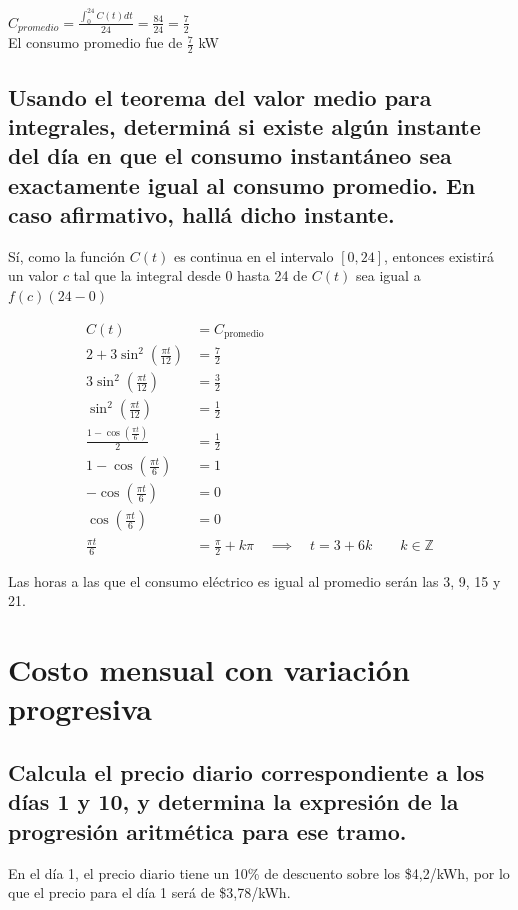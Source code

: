 \documentclass[11pt, a4paper]{article}
\begin{document}
$C_{promedio} = \frac{\int_{0}^{24} C(t)dt}{24} = \frac{84}{24} = \frac{7}{2}$\\

El consumo promedio fue de $\frac{7}{2}$ kW

\subsection{Usando el teorema del valor medio para integrales, determiná si existe algún instante del día en que el consumo instantáneo sea exactamente igual al consumo promedio. En caso afirmativo, hallá dicho instante.}

Sí, como la función $C(t)$ es continua en el intervalo $[0,24]$, entonces existirá un valor $c$ tal que la integral desde 0 hasta 24 de $C(t)$ sea igual a $f(c)(24 - 0)$

\begin{align*}
    C(t) &= C_{\text{promedio}} \\
    2 + 3\sin^2\left(\frac{\pi t}{12}\right) &= \frac{7}{2} \\
    3\sin^2\left(\frac{\pi t}{12}\right) &= \frac{3}{2} \\
    \sin^2\left(\frac{\pi t}{12}\right) &= \frac{1}{2} \\
    \frac{1 - \cos\left(\frac{\pi t}{6}\right)}{2} &= \frac{1}{2} \\
    1 - \cos\left(\frac{\pi t}{6}\right) &= 1 \\
    -\cos\left(\frac{\pi t}{6}\right) &= 0 \\
    \cos\left(\frac{\pi t}{6}\right) &= 0 \\
    \frac{\pi t}{6} &= \frac{\pi}{2} + k \pi \quad \implies \quad t = 3 + 6k \qquad k \in \mathbb{Z}
\end{align*}

Las horas a las que el consumo eléctrico es igual al promedio serán las 3, 9, 15 y 21.

\section{Costo mensual con variación progresiva}
\subsection{Calcula el precio diario correspondiente a los días 1 y 10, y determina la expresión de la progresión aritmética para ese tramo.}

En el día 1, el precio diario tiene un 10\% de descuento sobre los \$4,2/kWh, por lo que el precio para el día 1 será de \$3,78/kWh. \\
\end{document}
